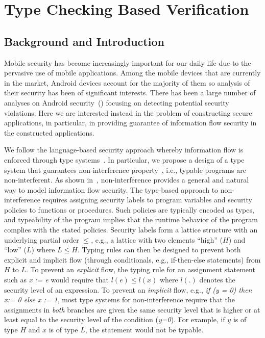 
\chapter{Type Checking Based Verification} \label{ch:sta}

\section{Background and Introduction}\label{sec:sta_intro}

Mobile security has become increasingly important for our daily life due to the pervasive use of mobile applications.
Among the mobile devices that are currently in the market, Android devices account for the majority of them so analysis of their security
has been of significant interests. There has been a large number of analyses on Android security~(\cite{Enck:2009:UAS:1512148.1512324, Fuchs2010, Arzt:2014:FPC:2666356.2594299, Wei:2014:APG:2660267.2660357, Li:2015:IDI:2818754.2818791}) focusing on detecting potential security violations. Here we are interested instead in the problem of constructing secure applications,
in particular, in providing guarantee of information flow security in the constructed applications. 
 
We follow the language-based security approach whereby
information flow is enforced through type systems~\cite{Denning:1976cl,Denning:1977hwa,Volpano:1996,Sabelfeld:2003}.
In particular, we propose a design of a type system that
guarantees non-interference property~\cite{Volpano:1996}, i.e., typable
programs are non-interferent. As shown in~\cite{Goguen:1982ta}, non-interference provides
a general and natural way to model information flow security.
The type-based approach to non-interference requires assigning
security labels to program variables and security policies to functions or procedures. Such policies
are typically encoded as types, and typeability of the program implies that the runtime behavior of
the program complies with the stated policies.
Security labels form a lattice structure with an underlying partial order $\leq$,
e.g., a lattice with two elements ``high'' ($H$) and ``low'' ($L$) where $L \leq H$.
Typing rules can then be designed to prevent both explicit
and implicit flow (through conditionals, e.g., if-then-else statements) from $H$ to $L$.
To prevent an \emph{explicit} flow, the typing rule for an assignment statement
such as \textit{x := e} would require that $l(e) \leq l(x)$ where $l(.)$
denotes the security level of an expression. To prevent an \emph{implicit} flow, e.g.,
\textit{if (y = 0) then x:= 0 else x := 1},
most type systems for non-interference require that
the assignments in \emph{both} branches are given the same
security level that is higher or at least equal to the security level of the condition (\emph{y=0}). 
For example, if $y$ is of type $H$ and $x$ is of type $L$, the statement would not be typable.

